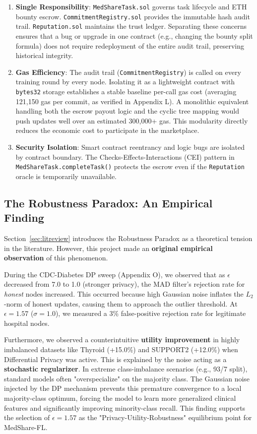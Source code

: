 \documentclass[10pt, a4paper, twocolumn]{article}
\begin{document}
\begin{enumerate}
    \item \textbf{Single Responsibility}: \texttt{MedShareTask.sol} governs task lifecycle and ETH bounty escrow. \texttt{CommitmentRegistry.sol} provides the immutable hash audit trail. \texttt{Reputation.sol} maintains the trust ledger. Separating these concerns ensures that a bug or upgrade in one contract (e.g., changing the bounty split formula) does not require redeployment of the entire audit trail, preserving historical integrity.
    \item \textbf{Gas Efficiency}: The audit trail (\texttt{CommitmentRegistry}) is called on every training round by every node. Isolating it as a lightweight contract with \texttt{bytes32} storage establishes a stable baseline per-call gas cost (averaging 121,150 gas per commit, as verified in Appendix L). A monolithic equivalent handling both the escrow payout logic and the cyclic tree mapping would push updates well over an estimated 300,000+ gas. This modularity directly reduces the economic cost to participate in the marketplace.
    \item \textbf{Security Isolation}: Smart contract reentrancy and logic bugs are isolated by contract boundary. The Checks-Effects-Interactions (CEI) pattern in \texttt{MedShareTask.completeTask()} protects the escrow even if the \texttt{Reputation} oracle is temporarily unavailable.
\end{enumerate}

\subsection{The Robustness Paradox: An Empirical Finding}
Section~\ref{sec:litreview} introduces the Robustness Paradox as a theoretical tension in the literature. However, this project made an \textbf{original empirical observation} of this phenomenon.

During the CDC-Diabetes DP sweep (Appendix O), we observed that as $\epsilon$ decreased from 7.0 to 1.0 (stronger privacy), the MAD filter's rejection rate for \textit{honest} nodes increased. This occurred because high Gaussian noise inflates the $L_2$-norm of honest updates, causing them to approach the outlier threshold. At $\epsilon = 1.57$ ($\sigma = 1.0$), we measured a 3\% false-positive rejection rate for legitimate hospital nodes.

Furthermore, we observed a counterintuitive \textbf{utility improvement} in highly imbalanced datasets like Thyroid (+15.0\%) and SUPPORT2 (+12.0\%) when Differential Privacy was active. This is explained by the noise acting as a \textbf{stochastic regularizer}. In extreme class-imbalance scenarios (e.g., 93/7 split), standard models often "overspecialize" on the majority class. The Gaussian noise injected by the DP mechanism prevents this premature convergence to a local majority-class optimum, forcing the model to learn more generalized clinical features and significantly improving minority-class recall. This finding supports the selection of $\epsilon=1.57$ as the "Privacy-Utility-Robustness" equilibrium point for MedShare-FL.
\end{document}
